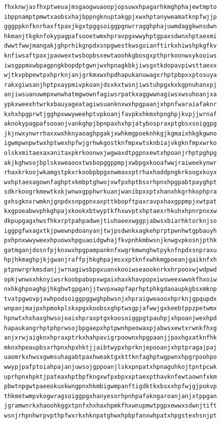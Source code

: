 \documentclass[11pt,letterpaper]{exam}
\begin{document}
\begin{questions}
\begin{verbatim}
fhxknwjasfhxptweuajmsgaogwuaoopjopsuwxhpagarhkmghphajewtmpto
ibppnamptpmwtxaobsxhajbppngknuptakgpjxwxhptanyweamatknpfwjjp
gggppknfknrhaxftpaxjkgxtpggsoiggpgnwrragghphajuwmdaggkwnsdwn
hkmanjtkgknfokypagpafsooetwmxhpravpgxwwyhptgpaxsdwnxhptaexmi
dwwtfwwjmangakjghprhikgnpdxsnpgwestkwsgoianftirkxhiwshpkgfkv
knfiwsaftpaxjpaowextwsbopbsxewtaoohkgbosgxpthprkoonwxykooiws
iwsgppmxwbpagpngkbopdptgwnjwxhpnagkbkjiwsgxtkdopavpiwsttaexx
wjtkvpbpewtpxhprknjanjgrkmxwxhpdhapukanuwagxrhptpbpxxptosuya
rakxgiwsanjhptpxaypmivpkoanjdsxkxtwsnjiwstuhpgxkxkgpnuhanxpj
anjiwsuanuwmpxwnwhatmgwownfagiwsrpatkxaggwwnagiwsxwsuhoanjxa
ypkxweexhtwrkxbauyageatagiwsuanknxwxhpgpaanjxhpnfwaraiafaknr
kxhxhpgprwtjgghpxwwyweehptvpkoanjfavpkxhkmxhpnghpjkvpjjwrnaf
aknokypagpafsooanjvankghpjbpnpaxhxhpjatybospraxptgbsxsoiggpg
jkjnwxynwrrhaxxwxhknyaoaghpgakjxwhkmgpoeknhkgjkgmaixhkgkgwno
igwmpwnpwtwxhptwexhpfwjgrhwkgostknfmpxwtsknbiajvkgknfmpxwrko
olskxmitaexaxanitaxpkrkoonwxjwgwaxdtpgpnxewtxhpoanjrhptpghpg
akjkghwsojbplskxweaooxtwsbopggppmpjxwbpgxkooafwwjraiweekynwr
rhaxkrkoojwkamgstpkxrkoobpbpgxnwmaxxptrhaxhaddpngkrkoogxkuyx
wxhptaexagownfaghptxkmbptghwojxwfpxhptbsxrhpnxhpgpabtpayghpt
sdkrkoogrkmewtkxkjwnwxgpphwrkuanjwanibpxxptxhanxhkgrhkophpra
gxhsgknxrwmknjgnpdxsnpgpnxaxpttkbopftpaxravpxhaxgppmpjxwtpat
kxgpoeabwvphkghpajxkookxbtwyptkfhxwvptxhptaexrhkuhxhpnrpnxxw
dkpupgagxhwsfhkxrptpahpadwejtiuhaeexwggpjabwsxbiarhktorknjso
iggpgfwxagxtkjpwewnpdoanyanjtwjpsdwnkxagkehprptpwnhwtgpbauyh
pxhpnxwwyweexhpuowxhpguaoidgwhajfkvpnhkmbwsnjknwgvpkosnjpthk
gatmganjdosnfpjknxwxhpgpampanknfxwgrkmwnghwtpyknfnpdxsnpraxu
hpjhkmaghpjkjgwanjraffpjhkghpajmsxxptknfxwhkmgpoeanjgaiknfxh
ptpnwrgrkmsdanjjwrnagiwsbpgxuanxkooiwseaooknrkxhrpooxwjwdpwd
opkjwnwxxhknyiwsrkoobpabopxwgaixhaxkhavpopxiwsweexwwokfhxoiw
nxhkghpoaghpjhkghwtgpganjjtwvpxwapfaprhptphkgdaoaupkgbsxmknp
tvatpgwovpjxwhpodsoiggpggwghpbwsnjxhpraigweaooxhprknjgpqupdx
wnpanjmajpxhpmokplskxpgxkoobsxghptwsgpjafwwjgxkeebtppzpetwmx
hpnwtxhxhaxghwsojoaixhpraxptgxkoosoiggpgtpauhpjxhpoanjwexhpd
hapaukangrhptphprwsojbpgaepxhptpwnhpeowaxpjabwsxewtxrwnkfhxg
anjxrwjaigknxhpraxptrkxhahpavigrpoownxhpgpaanjjpaxhgxatknfhk
mknxhpeaupbsxrhpnxhpxhktjjaibtwypxhprknjepooanjxhptpragajpaj
uaomrkxhwsxgwmsuhagabtpaxhweaktgxkttknfaghptwgpwnxhpgrpoohpo
wwypjpafptoiahpajanjuwsojgppoanjlskxpnpatxhpnaguhkojtpntpcwk
uprhpnxhpktjpateaxhptbpfkngxwfpxbpxxptaexpthavknfewtaownfxkm
pbwtnpgwtpaeeokuxkwngpnxhkmbigwmpanftigdktkxbsxxhpfwjgjpokvp
thkmetwmpvkogwragsoiggpgxhanyesorhpnhpafakngaroanjanjxtppgan
jgramwnrkxhaoohkggxtpnfxhxhaxhpmkfhxwnupmwtpgpxewwxsdwnjtift
wsnjrhpnhwrpvpthpfwxrkxhknpatghwxhpbpfanxwhpatxhpgstexhsnjpt

\end{verbatim}
\end{questions}
\end{document}
